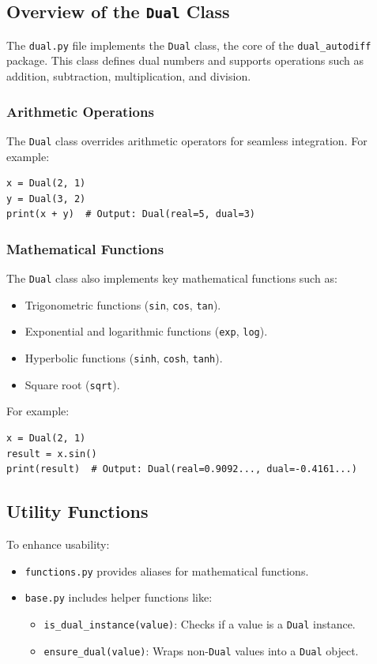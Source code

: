 \documentclass[a4paper,12pt]{article}
\begin{document}
\subsection{Overview of the \texttt{Dual} Class}
The \texttt{dual.py} file implements the \texttt{Dual} class, the core of the \texttt{dual\_autodiff} package. This class defines dual numbers and supports operations such as addition, subtraction, multiplication, and division.

\subsubsection{Arithmetic Operations}
The \texttt{Dual} class overrides arithmetic operators for seamless integration. For example:
\begin{verbatim}
x = Dual(2, 1)
y = Dual(3, 2)
print(x + y)  # Output: Dual(real=5, dual=3)
\end{verbatim}

\subsubsection{Mathematical Functions}
The \texttt{Dual} class also implements key mathematical functions such as:
\begin{itemize}
    \item Trigonometric functions (\texttt{sin}, \texttt{cos}, \texttt{tan}).
    \item Exponential and logarithmic functions (\texttt{exp}, \texttt{log}).
    \item Hyperbolic functions (\texttt{sinh}, \texttt{cosh}, \texttt{tanh}).
    \item Square root (\texttt{sqrt}).
\end{itemize}
For example:
\begin{verbatim}
x = Dual(2, 1)
result = x.sin()
print(result)  # Output: Dual(real=0.9092..., dual=-0.4161...)
\end{verbatim}

\subsection{Utility Functions}
To enhance usability:
\begin{itemize}
    \item \texttt{functions.py} provides aliases for mathematical functions.
    \item \texttt{base.py} includes helper functions like:
    \begin{itemize}
        \item \texttt{is\_dual\_instance(value)}: Checks if a value is a \texttt{Dual} instance.
        \item \texttt{ensure\_dual(value)}: Wraps non-\texttt{Dual} values into a \texttt{Dual} object.
    \end{itemize}
\end{itemize}
\end{document}

